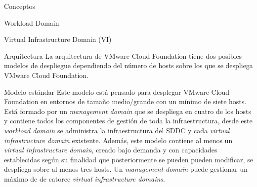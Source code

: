 \begin{section}{Conceptos}
\begin{subsection}{Workload Domain}
\begin{subsubsection}{Virtual Infrastructure Domain (VI)}


 \end{subsubsection}

\end{subsection}




\begin{subsection}{Arquitectura}
La arquitectura de VMware Cloud Foundation tiene dos posibles modelos de despliegue dependiendo del número de hosts sobre los que se despliega VMware Cloud Foundation.
\begin{subsubsection}{Modelo estándar}
Este modelo está pensado para desplegar VMware Cloud Foundation en entornos de tamaño medio/grande con un mínimo de siete hosts. Está formado por un \textit{management domain} que se despliega en cuatro de los hosts y contiene todos los componentes de gestión de toda la infraestructura, desde este \textit{workload domain} se administra la infraestructura del SDDC y cada \textit{virtual infrastructure domain} existente. Además, este modelo contiene al menos un \textit{virtual infrastructure domain}, creado bajo demanda y con capacidades establecidas según su finalidad que posteriormente se pueden pueden modificar, se despliega sobre al menos tres hosts. Un \textit{management domain} puede gestionar un máximo de de catorce \textit{virtual infrastructure domains}.


\end{subsubsection}
\end{subsection}
\end{section}
